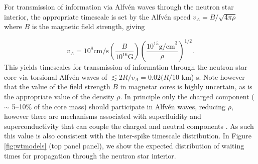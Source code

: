 \documentclass[12pt]{emulateapj}
\begin{document}
For transmission of information via Alfv\'en waves through the neutron star interior, the appropriate timescale is set by the Alfv\'en speed 
$v_A = B/\sqrt{4\pi\rho}$ where $B$ is the magnetic field strength, giving

\begin{equation}
v_A = 10^8 \mathrm{cm/s} \left(\frac{B}{10^{16} \mathrm{G}}\right) \left(\frac{10^{15} \mathrm{g/cm}^3}{\rho}\right)^{1/2}.
\end{equation}
This yields timescales for transmission of information through the neutron star core via torsional Alfv\'en waves of $\lesssim 2R/v_A = 0.02 (R/$10 km) s.
 Note however that the value of the field strength $B$ in magnetar cores is highly uncertain, as is the appropriate value of the density $\rho$. In principle 
 only the charged component ($\sim$ 5--10\% of the core mass) should participate in Alfv\'en waves, reducing $\rho$, however there are mechanisms 
 associated with superfluidity and superconductivity that can couple the charged and neutral components \citep{vanhoven2008,andersson2009}. As such this value is also consistent with the 
 inter-spike timescale distribution. In Figure \ref{fig:wtmodels} (top panel panel), we show the expected distribution of waiting times for propagation through 
 the neutron star interior. 
\end{document}
